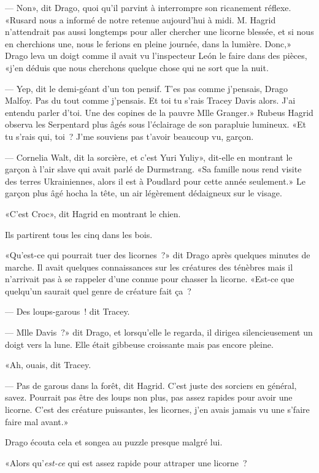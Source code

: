 --- Non», dit Drago, quoi qu'il parvint à interrompre son ricanement réflexe. «Rusard nous a informé de notre retenue aujourd'hui à midi. M. Hagrid n'attendrait pas aussi longtemps pour aller chercher une licorne blessée, et si nous en cherchions une, nous le ferions en pleine journée, dans la lumière. Donc,» Drago leva un doigt comme il avait vu l'inspecteur León le faire dans des pièces, «j'en déduis que nous cherchons quelque chose qui ne sort que la nuit.

--- Yep, dit le demi-géant d'un ton pensif. T'es pas comme j'pensais, Drago Malfoy. Pas du tout comme j'pensais. Et toi tu s'rais Tracey Davis alors. J'ai entendu parler d'toi. Une des copines de la pauvre Mlle Granger.» Rubeus Hagrid observa les Serpentard plus âgés sous l'éclairage de son parapluie lumineux. «Et tu s'rais qui, toi~? J'me souviens pas t'avoir beaucoup vu, garçon.

--- Cornelia Walt, dit la sorcière, et c'est Yuri Yuliy», dit-elle en montrant le garçon à l'air slave qui avait parlé de Durmstrang. «Sa famille nous rend visite des terres Ukrainiennes, alors il est à Poudlard pour cette année seulement.» Le garçon plus âgé hocha la tête, un air légèrement dédaigneux sur le visage.

«C'est Croc», dit Hagrid en montrant le chien.

Ils partirent tous les cinq dans les bois.

«Qu'est-ce qui pourrait tuer des licornes~?» dit Drago après quelques minutes de marche. Il avait quelques connaissances sur les créatures des ténèbres mais il n'arrivait pas à se rappeler d'une connue pour chasser la licorne. «Est-ce que quelqu'un saurait quel genre de créature fait ça~?

--- Des loups-garous~! dit Tracey.

--- Mlle Davis~?» dit Drago, et lorsqu'elle le regarda, il dirigea silencieusement un doigt vers la lune. Elle était gibbeuse croissante mais pas encore pleine.

«Ah, ouais, dit Tracey.

--- Pas de garous dans la forêt, dit Hagrid. C'est juste des sorciers en général, savez. Pourrait pas être des loups non plus, pas assez rapides pour avoir une licorne. C'est des créature puissantes, les licornes, j'en avais jamais vu une s'faire faire mal avant.»

Drago écouta cela et songea au puzzle presque malgré lui.

«Alors qu'\emph{est-ce} qui est assez rapide pour attraper une licorne~?


